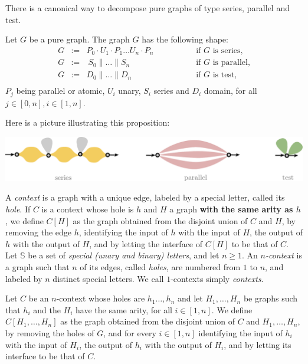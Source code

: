    There is a canonical way to decompose pure graphs of type series, parallel and test. 
 \begin{proposition}
 Let $G$ be a pure graph. The graph $G$ has the following shape:
 $$\begin{array}{llll}
 G&:=&  P_0\cdot U_1 \cdot P_1 \dots U_n\cdot P_n & \qquad \qquad\text{ if $G$ is series,}\\[3pt]
 G&:=&  \ S_0\parallel  \dots \parallel S_n &  \qquad \qquad\text{ if $G$ is parallel,}\\[3pt]
 G&:=&  D_0\parallel  \dots \parallel D_n &  \qquad \qquad\text{ if $G$ is test,}\\
 \end{array}$$
 $P_j$ being parallel or atomic, $U_i$ unary, $S_i$ series and $D_i$ domain, for all $j\in[0,n], i\in[1,n]$.
\end{proposition}
Here is a picture illustrating this proposition:
\begin{center}
\includegraphics[scale=.35]{Pictures/spt}
\end{center}
\begin{definition}[Contexts]
A \emph{context} is a graph with a unique edge, labeled by a special letter, called its \emph{hole}.  If $C$ is a context whose hole is $h$ and $H$ a graph \textbf{with the same arity as $h$}, we define $C[H]$ as the graph obtained from the disjoint union of $C$ and $H$, by removing the edge $h$,  identifying the input of $h$ with the input of $H$, the output of $h$ with the output of $H$, and  by letting the interface of $C[H]$ to be that of $C$. 
Let $\mathbb{S}$ be a set of \emph{special (unary and binary) letters}, and let $n\geq 1$. An \emph{$n$-context}  is a graph such that $n$ of its edges, called \emph{holes}, are numbered from $1$ to $n$, and labeled by $n$ distinct special letters.  We call $1$-contexts simply \emph{contexts}.

Let $C$ be an $n$-context whose holes are $h_1\dots,h_n$ and let $H_1,\dots,H_n$ be graphs such that $h_i$ and the $H_i$ have the same arity, for all $i\in [1, n]$.  We define $C[H_1,\dots,H_n]$ as the graph obtained from the disjoint union of $C$ and $H_1,\dots, H_n$, by removing the holes of $G$, and for every $i\in[1,n]$  identifying the input of $h_i$ with the input of $H_i$, the output of $h_i$ with the output of $H_i$, and  by letting its interface to be that of $C$.
\end{definition}

